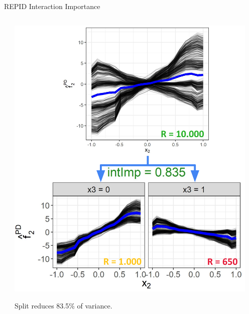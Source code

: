 \documentclass[10pt,compress,t,notes=noshow, xcolor=table]{beamer}
\begin{document}
\begin{frame}{REPID Interaction Importance}
\begin{columns}[T, totalwidth=\textwidth]
\begin{column}{0.55\textwidth}
\begin{center}
\end{center}
    \end{column}
\pause
    \begin{column}{0.45\textwidth}
 \centering
\includegraphics[width = 0.95\textwidth]{figure/sim1_fake.png}

Split reduces 83.5\% of variance.
    \end{column}
\end{columns}

\end{frame}
\end{document}
